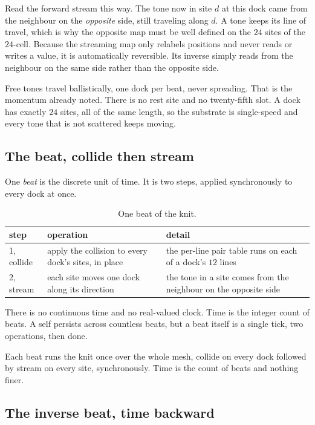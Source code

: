 Read the forward stream this way. The tone now in site $d$ at this dock came from the neighbour on the \emph{opposite} side, still traveling along $d$. A tone keeps its line of travel, which is why the opposite map must be well defined on the $24$ sites of the $24$-cell. Because the streaming map only relabels positions and never reads or writes a value, it is automatically reversible. Its inverse simply reads from the neighbour on the same side rather than the opposite side.

Free tones travel ballistically, one dock per beat, never spreading. That is the momentum already noted. There is no rest site and no twenty-fifth slot. A dock has exactly $24$ sites, all of the same length, so the substrate is single-speed and every tone that is not scattered keeps moving.

\subsection{The beat, collide then stream}

One \emph{beat} is the discrete unit of time. It is two steps, applied synchronously to every dock at once.

\begin{table}[ht]
\centering
\begin{tabular}{@{}lll@{}}
\toprule
step & operation & detail \\
\midrule
1, collide & apply the collision to every dock's sites, in place & the per-line pair table runs on each of a dock's $12$ lines \\
2, stream & each site moves one dock along its direction & the tone in a site comes from the neighbour on the opposite side \\
\bottomrule
\end{tabular}
\caption{One beat of the knit.}
\label{tab:the-beat}
\end{table}

There is no continuous time and no real-valued clock. Time is the integer count of beats. A self persists across countless beats, but a beat itself is a single tick, two operations, then done.

\begin{axiom}
Each beat runs the knit once over the whole mesh, collide on every dock followed by stream on every site, synchronously. Time is the count of beats and nothing finer.
\end{axiom}

\subsection{The inverse beat, time backward}

